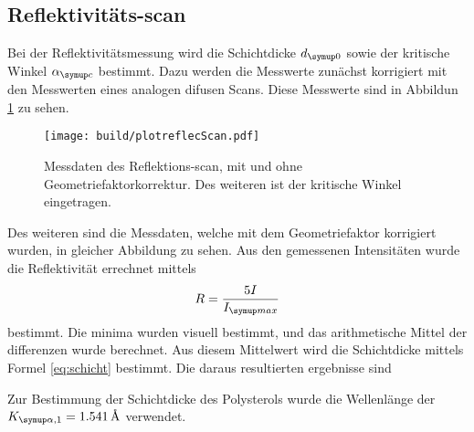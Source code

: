 \subsection{Reflektivitäts-scan}
Bei der Reflektivitätsmessung wird die Schichtdicke $d\idx{0}$ sowie der kritische Winkel $\alpha\idx{c}$ bestimmt. Dazu werden die Messwerte
zunächst korrigiert mit den Messwerten eines analogen difusen Scans. Diese Messwerte sind in Abbildun \ref{fig:refl} zu sehen. 
\begin{figure}
    \centering
    \texttt{[image: build/plotreflecScan.pdf]}
    \caption{Messdaten des Reflektions-scan, mit und ohne Geometriefaktorkorrektur. Des weiteren ist der kritische Winkel eingetragen.}
    \label{fig:refl}
\end{figure}
Des weiteren sind die Messdaten, welche mit dem Geometriefaktor korrigiert wurden, in gleicher Abbildung zu sehen. Aus den gemessenen 
Intensitäten wurde die Reflektivität errechnet mittels
\begin{equation}
    R = \frac{5I}{I\idx{max}}
\end{equation}
bestimmt. Die minima wurden visuell bestimmt, und das arithmetische Mittel der differenzen wurde berechnet. Aus diesem Mittelwert wird die 
Schichtdicke mittels Formel \eqref{eq:schicht} bestimmt. Die daraus resultierten ergebnisse sind 

Zur Bestimmung der Schichtdicke des Polysterols wurde die Wellenlänge der $K\idx{\alpha, 1} = 1.541\,\si{\angstrom}$ verwendet.
